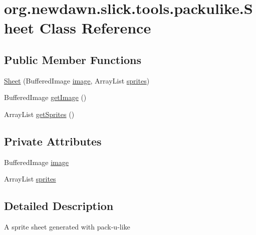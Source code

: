 \hypertarget{classorg_1_1newdawn_1_1slick_1_1tools_1_1packulike_1_1_sheet}{}\section{org.\+newdawn.\+slick.\+tools.\+packulike.\+Sheet Class Reference}
\label{classorg_1_1newdawn_1_1slick_1_1tools_1_1packulike_1_1_sheet}
\subsection*{Public Member Functions}
\begin{DoxyCompactItemize}
\item 
\mbox{\hyperlink{classorg_1_1newdawn_1_1slick_1_1tools_1_1packulike_1_1_sheet_ad02822548563742c6d75a068510fa2bb}{Sheet}} (Buffered\+Image \mbox{\hyperlink{classorg_1_1newdawn_1_1slick_1_1tools_1_1packulike_1_1_sheet_a293f7e890edde54541fcf1e9bed59c13}{image}}, Array\+List \mbox{\hyperlink{classorg_1_1newdawn_1_1slick_1_1tools_1_1packulike_1_1_sheet_a57221917a8aa9d65fd4c1488d7b219fb}{sprites}})
\item 
Buffered\+Image \mbox{\hyperlink{classorg_1_1newdawn_1_1slick_1_1tools_1_1packulike_1_1_sheet_a343cacb8c7c31ae63b618d6e1d42fffb}{get\+Image}} ()
\item 
Array\+List \mbox{\hyperlink{classorg_1_1newdawn_1_1slick_1_1tools_1_1packulike_1_1_sheet_ae40b2914e5488aa73119e4c7b68ab93a}{get\+Sprites}} ()
\end{DoxyCompactItemize}
\subsection*{Private Attributes}
\begin{DoxyCompactItemize}
\item 
Buffered\+Image \mbox{\hyperlink{classorg_1_1newdawn_1_1slick_1_1tools_1_1packulike_1_1_sheet_a293f7e890edde54541fcf1e9bed59c13}{image}}
\item 
Array\+List \mbox{\hyperlink{classorg_1_1newdawn_1_1slick_1_1tools_1_1packulike_1_1_sheet_a57221917a8aa9d65fd4c1488d7b219fb}{sprites}}
\end{DoxyCompactItemize}


\subsection{Detailed Description}
A sprite sheet generated with pack-\/u-\/like

